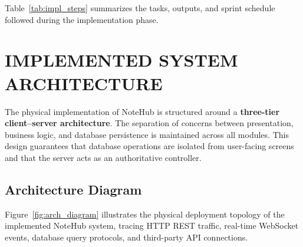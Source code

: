 \documentclass[12,Times new Roman,a4paper]{report}
\renewcommand{\arraystretch}{1.5} %
\begin{document}
Table~\ref{tab:impl_steps} summarizes the tasks, outputs, and sprint schedule followed during the implementation phase.

\begin{table}[htbp]
\centering
\renewcommand{\arraystretch}{1.5}
\caption{NoteHub Implementation Steps Summary}
\label{tab:impl_steps}
\end{table}

\newpage
\section{IMPLEMENTED SYSTEM ARCHITECTURE}

The physical implementation of NoteHub is structured around a \textbf{three-tier client--server architecture}. The separation of concerns between presentation, business logic, and database persistence is maintained across all modules. This design guarantees that database operations are isolated from user-facing screens and that the server acts as an authoritative controller.

\subsection{Architecture Diagram}

Figure~\ref{fig:arch_diagram} illustrates the physical deployment topology of the implemented NoteHub system, tracing HTTP REST traffic, real-time WebSocket events, database query protocols, and third-party API connections.
\end{document}
